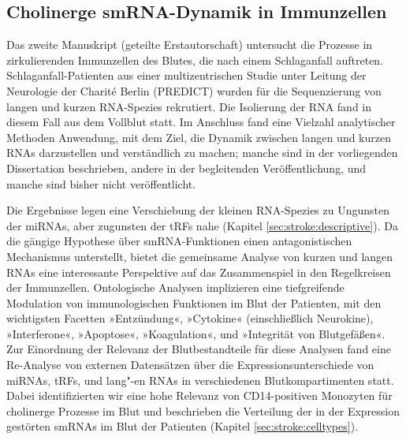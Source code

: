 \subsection{Cholinerge smRNA-Dynamik in Immunzellen}
Das zweite Manuskript (geteilte Erstautorschaft) untersucht die Prozesse in zirkulierenden Immunzellen des Blutes, die nach einem Schlaganfall auftreten.\cite{Winek2020} Schlaganfall-Patienten aus einer multizentrischen Studie unter Leitung der Neurologie der Charité Berlin (PREDICT\cite{Hoffmann2017}) wurden für die Sequenzierung von langen und kurzen RNA-Spezies rekrutiert. Die Isolierung der RNA fand in diesem Fall aus dem Vollblut statt. Im Anschluss fand eine Vielzahl analytischer Methoden Anwendung, mit dem Ziel, die Dynamik zwischen langen und kurzen RNAs darzustellen und verständlich zu machen; manche sind in der vorliegenden Dissertation beschrieben, andere in der begleitenden Veröffentlichung, und manche sind bisher nicht veröffentlicht.

Die Ergebnisse legen eine Verschiebung der kleinen RNA-Spezies zu Ungunsten der miRNAs, aber zugunsten der tRFs nahe (Kapitel \ref{sec:stroke:descriptive}). Da die gängige Hypothese über smRNA-Funktionen einen antagonistischen Mechanismus unterstellt, bietet die gemeinsame Analyse von kurzen und langen RNAs eine interessante Perspektive auf das Zusammenspiel in den Regelkreisen der Immunzellen. Ontologische Analysen implizieren eine tiefgreifende Modulation von immunologischen Funktionen im Blut der Patienten, mit den wichtigsten Facetten »Entzündung«, »Cytokine« (einschließlich Neurokine), »Interferone«, »Apoptose«, »Koagulation«, und »Integrität von Blutgefäßen«. Zur Einordnung der Relevanz der Blutbestandteile für diese Analysen fand eine Re-Analyse von externen Datensätzen über die Expressionsunterschiede von miRNAs, tRFs, und lang"-en RNAs in verschiedenen Blutkompartimenten statt. Dabei identifizierten wir eine hohe Relevanz von CD14-positiven Monozyten für cholinerge Prozesse im Blut und beschrieben die Verteilung der in der Expression gestörten smRNAs im Blut der Patienten (Kapitel \ref{sec:stroke:celltypes}).

